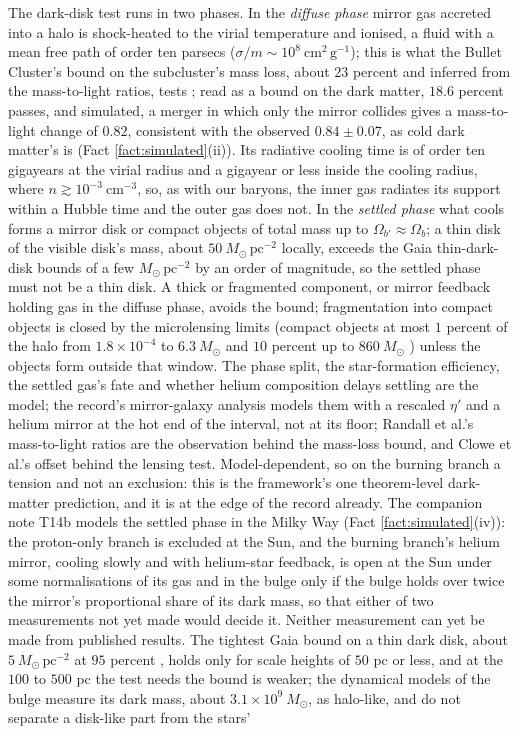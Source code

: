 \documentclass[11pt]{article}
\theoremstyle{definition}
\begin{document}
\begin{enumerate}
The dark-disk test runs in two phases. In the \emph{diffuse phase} mirror gas accreted into a halo is shock-heated to the virial temperature and ionised, a fluid with a mean free path of order ten parsecs ($\sigma/m \sim 10^{8}\ \mathrm{cm^{2}\,g^{-1}}$); this is what the Bullet Cluster's bound on the subcluster's mass loss, about $23$ percent and inferred from the mass-to-light ratios, tests \cite{Randall2008}; read as a bound on the dark matter, $18.6$ percent passes, and simulated, a merger in which only the mirror collides gives a mass-to-light change of $0.82$, consistent with the observed $0.84 \pm 0.07$, as cold dark matter's is (Fact \ref{fact:simulated}(ii)). Its radiative cooling time is of order ten gigayears at the virial radius and a gigayear or less inside the cooling radius, where $n \gtrsim 10^{-3}\ \mathrm{cm^{-3}}$, so, as with our baryons, the inner gas radiates its support within a Hubble time and the outer gas does not. In the \emph{settled phase} what cools forms a mirror disk or compact objects of total mass up to $\Omega_{b'} \approx \Omega_{b}$; a thin disk of the visible disk's mass, about $50\ M_{\odot}\,\mathrm{pc^{-2}}$ locally, exceeds the Gaia thin-dark-disk bounds of a few $M_{\odot}\,\mathrm{pc^{-2}}$ \cite{Schutz2018, Widmark2021} by an order of magnitude, so the settled phase must not be a thin disk. A thick or fragmented component, or mirror feedback holding gas in the diffuse phase, avoids the bound; fragmentation into compact objects is closed by the microlensing limits (compact objects at most $1$ percent of the halo from $1.8 \times 10^{-4}$ to $6.3\ M_{\odot}$ and $10$ percent up to $860\ M_{\odot}$ \cite{Mroz2024}) unless the objects form outside that window. The phase split, the star-formation efficiency, the settled gas's fate and whether helium composition delays settling are the model; the record's mirror-galaxy analysis \cite{RouxCline2020} models them with a rescaled $\eta'$ and a helium mirror at the hot end of the interval, not at its floor; Randall et al.'s mass-to-light ratios \cite{Randall2008} are the observation behind the mass-loss bound, and Clowe et al.'s offset \cite{Clowe2006} behind the lensing test. Model-dependent, so on the burning branch a tension and not an exclusion: this is the framework's one theorem-level dark-matter prediction, and it is at the edge of the record already. The companion note T14b models the settled phase in the Milky Way (Fact \ref{fact:simulated}(iv)): the proton-only branch is excluded at the Sun, and the burning branch's helium mirror, cooling slowly and with helium-star feedback, is open at the Sun under some normalisations of its gas and in the bulge only if the bulge holds over twice the mirror's proportional share of its dark mass, so that either of two measurements not yet made would decide it. Neither measurement can yet be made from published results. The tightest Gaia bound on a thin dark disk, about $5\ M_{\odot}\,\mathrm{pc^{-2}}$ at $95$ percent \cite{Widmark2021}, holds only for scale heights of $50$ pc or less, and at the $100$ to $500$ pc the test needs the bound is weaker; the dynamical models of the bulge \cite{Portail2017} measure its dark mass, about $3.1 \times 10^{9}\ M_{\odot}$, as halo-like, and do not separate a disk-like part from the stars' 
\end{enumerate}
\end{document}
